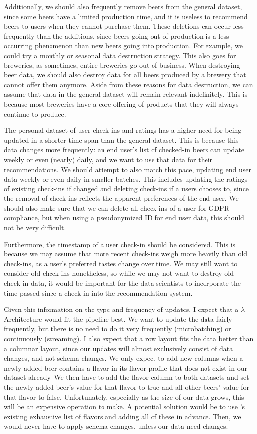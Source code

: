 \documentclass[sigconf]{acmart}
\begin{document}
Additionally, we should also frequently remove beers from the general dataset, since some beers have a limited production time, and it is useless to recommend beers to users when they cannot purchase them.
These deletions can occur less frequently than the additions, since beers going out of production is a less occurring phenomenon than new beers going into production.
For example, we could try a monthly or seasonal data destruction strategy.
This also goes for breweries, as sometimes, entire breweries go out of business.
When destroying beer data, we should also destroy data for all beers produced by a brewery that cannot offer them anymore.
Aside from these reasons for data destruction, we can assume that data in the general dataset will remain relevant indefinitely.
This is because most breweries have a core offering of products that they will always continue to produce.

The personal dataset of user check-ins and ratings has a higher need for being updated in a shorter time span than the general dataset.
This is because this data changes more frequently: an end user's list of checked-in beers can update weekly or even (nearly) daily, and we want to use that data for their recommendations.
We should attempt to also match this pace, updating end user data weekly or even daily in smaller batches.
This includes updating the ratings of existing check-ins if changed and deleting check-ins if a users chooses to, since the removal of check-ins reflects the apparent preferences of the end user.
We should also make sure that we can delete all check-ins of a user for GDPR compliance, but when using a pseudonymized ID for end user data, this should not be very difficult.

Furthermore, the timestamp of a user check-in should be considered.
This is because we may assume that more recent check-ins weigh more heavily than old check-ins, as a user's preferred tastes change over time.
We may still want to consider old check-ins nonetheless, so while we may not want to destroy old check-in data, it would be important for the data scientists to incorporate the time passed since a check-in into the recommendation system.

Given this information on the type and frequency of updates, I expect that a $\lambda$-Architecture would fit the pipeline best.
We want to update the data fairly frequently, but there is no need to do it very frequently (microbatching) or continuously (streaming).
I also expect that a row layout fits the data better than a columnar layout, since our updates will almost exclusively consist of data changes, and not schema changes.
We only expect to add new columns when a newly added beer contains a flavor in its flavor profile that does not exist in our dataset already.
We then have to add the flavor column to both datasets and set the newly added beer's value for that flavor to true and all other beers' value for that flavor to false.
Unfortunately, especially as the size of our data grows, this will be an expensive operation to make.
A potential solution would be to use \citeauthor{untappd}'s existing exhaustive list of flavors and adding all of these in advance.
Then, we would never have to apply schema changes, unless our data need changes.
\end{document}
